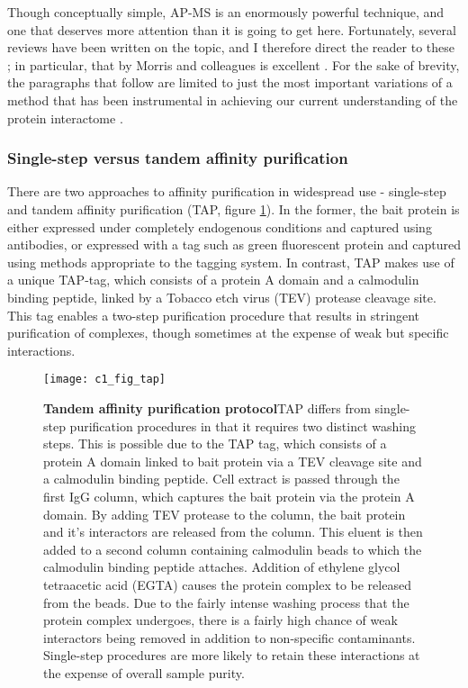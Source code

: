 \documentclass[a4paper,11pt,twoside,openright]{scrbook}
\begin{document}
Though conceptually simple, AP-MS is an enormously powerful technique, and one that deserves more attention than it is going to get here. Fortunately, several reviews have been written on the topic, and I therefore direct the reader to these \cite{Oeffinger2012,Morris2014,Aebersold2016}; in particular, that by Morris and colleagues is excellent \cite{Morris2014}. For the sake of brevity, the paragraphs that follow are limited to just the most important variations of a method that has been instrumental in achieving our current understanding of the protein interactome \cite{Malovannaya2011,Hein2015,Huttlin2015,Wan2015}.

\subsubsection{Single-step versus tandem affinity purification}
There are two approaches to affinity purification in widespread use - single-step and tandem affinity purification \cite{Rigaut1999} (TAP, figure \ref{figure:tap}). In the former, the bait protein is either expressed under completely endogenous conditions and captured using antibodies, or expressed with a tag such as green fluorescent protein \cite{Hubner2010} and captured using methods appropriate to the tagging system. In contrast, TAP makes use of a unique TAP-tag, which consists of a protein A domain and a calmodulin binding peptide, linked by a Tobacco etch virus (TEV) protease cleavage site. This tag enables a two-step purification procedure that results in stringent purification of complexes, though sometimes at the expense of weak but specific interactions.

\begin{figure}[h]
\fcapsideright
    {\caption[Tandem affinity purification protocol]{\sffamily\textbf{Tandem affinity \newline purification protocol}\newline \small TAP differs from single-step purification procedures in that it requires two distinct washing steps. This is possible due to the TAP tag, which consists of a protein A domain linked to bait protein via a TEV cleavage site and a calmodulin binding peptide. Cell extract is passed through the first IgG column, which captures the bait protein via the protein A domain. By adding TEV protease to the column, the bait protein and it's interactors are released from the column. This eluent is then added to a second column containing calmodulin beads to which the calmodulin  binding peptide attaches. Addition of ethylene glycol tetraacetic acid (EGTA) causes the protein complex to be released from the beads. Due to the fairly intense washing process that the protein complex undergoes, there is a fairly high chance of weak interactors being removed in addition to non-specific contaminants. Single-step procedures are more likely to retain these interactions at the expense of overall sample purity.}\label{figure:tap}}
    {\texttt{[image: c1\_fig\_tap]}}
\end{figure}
\end{document}
